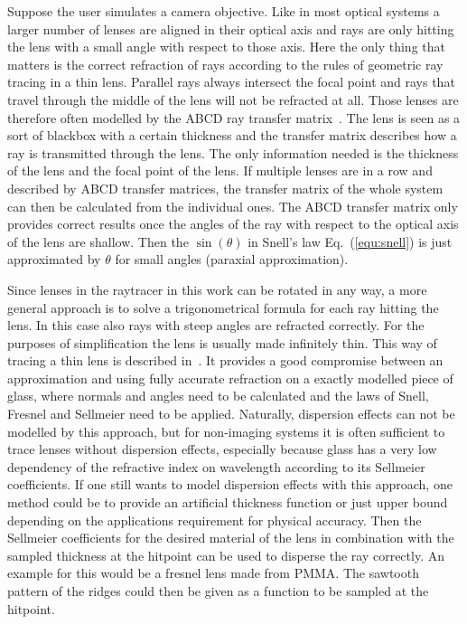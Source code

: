 \documentclass[a4paper,10pt]{article}
\newcommand{\equref}[1]{Eq.~(\ref{#1})}
\begin{document}
    Suppose the user simulates a camera objective.
    Like in most optical systems a larger number of lenses are 
    aligned in their optical axis and rays are only hitting the lens
    with a small angle with respect to those axis.
    Here the only thing that matters is the correct refraction of
    rays according to the rules of geometric ray tracing in a thin lens.
    Parallel rays always intersect the focal point and rays that
    travel through the middle of the lens will not be refracted
    at all.
    Those lenses are therefore often modelled by the ABCD ray transfer
    matrix~\cite{abcd_lens_rpphotonics}.
    The lens is seen as a sort of blackbox with a certain thickness
    and the transfer matrix describes how a ray is transmitted
    through the lens.
    The only information needed is the thickness of the lens and
    the focal point of the lens.
    If multiple lenses are in a row and described by ABCD transfer matrices,
    the transfer matrix of the whole system can then be calculated
    from the individual ones.
    The ABCD transfer matrix only provides correct results once the
    angles of the ray with respect to the optical axis of the lens
    are shallow.
    Then the $\sin(\theta)$ in Snell's law \equref{equ:snell} is
    just approximated by $\theta$ for small angles (paraxial approximation).

    Since lenses in the raytracer in this work can be rotated in any way,
    a more general approach is to solve a trigonometrical formula for
    each ray hitting the lens.
    In this case also rays with steep angles are refracted correctly.
    For the purposes of simplification the lens is usually made 
    infinitely thin.
    This way of tracing a thin lens is described in~\cite{thin_lens}.
    It provides a good compromise between an approximation and using 
    fully accurate refraction on a exactly modelled piece of glass, where normals and angles need to
    be calculated and the laws of Snell, Fresnel and Sellmeier need to be applied.
    Naturally, dispersion effects can not be modelled by this approach,
    but for non-imaging systems it is often sufficient to trace lenses
    without dispersion effects, especially because glass has a very
    low dependency of the refractive index on wavelength according to
    its Sellmeier coefficients.
    If one still wants to model dispersion effects with this approach,
    one method could be to provide an artificial thickness function 
    or just upper bound depending on the applications requirement for
    physical accuracy.
    Then the Sellmeier coefficients for the desired material of the lens
    in combination with the sampled thickness at the hitpoint can be used
    to disperse the ray correctly.
    An example for this would be a fresnel lens made from PMMA.
    The sawtooth pattern of the ridges could then be given as a function
    to be sampled at the hitpoint.
\end{document}
